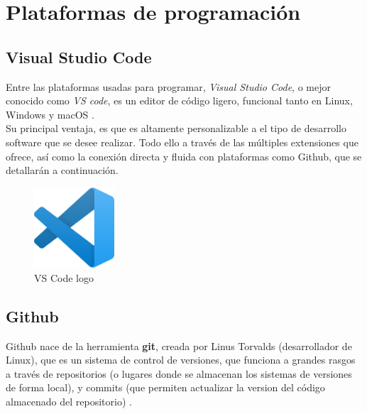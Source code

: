 \section{Plataformas de programación}
\label{sec:plataformas_de_programacion}

\subsection{Visual Studio Code}
\label{subsec:visual_studio_code}

Entre las plataformas usadas para programar, \emph{Visual Studio Code}, o mejor conocido como \emph{VS code}, es un editor de código ligero, funcional tanto en Linux, Windows y macOS \cite{vscode-def}.\\

Su principal ventaja, es que es altamente personalizable a el tipo de desarrollo software que se desee realizar. Todo ello a través de las múltiples extensiones que ofrece, así como la conexión directa y fluida con plataformas como Github, que se detallarán a continuación.\\

\begin{figure} [H]
	\begin{center}
	\includegraphics[height=3cm]{imagenes/cap3/4_vscode_logo.png}
	\end{center}
	\caption[VS Code logo]{VS Code logo}
	\label{fig:vscode}
\end{figure}

\subsection{Github}
\label{subsec:github}

Github nace de la herramienta \textbf{git}, creada por Linus Torvalds (desarrollador de Linux), que es un sistema de control de versiones, que funciona a grandes rasgos a través de repositorios (o lugares donde se almacenan los sistemas de versiones de forma local), y commits (que permiten actualizar la version del código almacenado del repositorio) \cite{github-def}.\\

